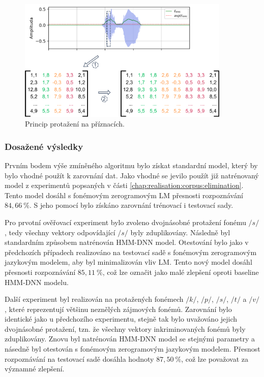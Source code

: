 \begin{figure}[hbpt]
  \centering
  \includegraphics[width=0.9\textwidth]{./ch5-construction/img/augmentation_features.pdf}
  \caption{Princip protažení na příznacích.}
  \label{fig:realisation:augmentation:features}
\end{figure}

\subsubsection{Dosažené výsledky}

Prvním bodem výše zmíněného algoritmu bylo získat standardní model, který by bylo vhodné použít k zarovnání dat.
Jako vhodné se jevilo použít již natrénovaný model z experimentů popsaných v části \ref{chap:realisation:corpus:elimination}.
Tento model dosáhl s fonémovým zerogramovým LM přesnosti rozpoznávání $84,66\ \%$.
S jeho pomocí bylo získáno zarovnání trénovací i testovací sady.

Pro prvotní ověřovací experiment bylo zvoleno dvojnásobné protažení fonému $/s/$, tedy všechny vektory odpovídající $/s/$ byly zduplikovány.
Následně byl standardním způsobem natrénován HMM-DNN model.
Otestování bylo jako v předchozích případech realizováno na testovací sadě s fonémovým zerogramovým jazykovým modelem, aby byl minimalizován vliv LM.
Tento nový model dosáhl přesnosti rozpoznávání $85,11\ \%$, což lze označit jako malé zlepšení oproti baseline HMM-DNN modelu.

Další experiment byl realizován na protažených fonémech $/k/$, $/p/$, $/s/$, $/t/$ a $/v/$, které reprezentují většinu neznělých zájmových fonémů.
Zarovnání bylo identické jako u předchozího experimentu, stejně tak bylo uvažováno jejich dvojnásobné protažení, tzn. že všechny vektory inkriminovaných fonémů byly zduplikovány.
Znovu byl natrénován HMM-DNN model se stejnými parametry a násedně byl otestován s fonémovým zerogramovým jazykovým modelem.
Přesnost rozpoznávání na testovací sadě dosáhla hodnoty $87,50\ \%$, což lze považovat za významné zlepšení.

